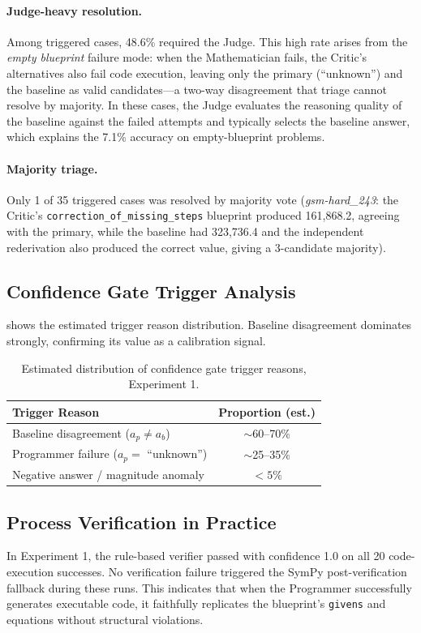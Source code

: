\documentclass[11pt,a4paper]{article}
\begin{document}
\paragraph{Judge-heavy resolution.}
Among triggered cases, 48.6\% required the Judge.
This high rate arises from the \emph{empty blueprint} failure mode: when the Mathematician fails, the Critic's alternatives also fail code execution, leaving only the primary (``unknown'') and the baseline as valid candidates---a two-way disagreement that triage cannot resolve by majority.
In these cases, the Judge evaluates the reasoning quality of the baseline against the failed attempts and typically selects the baseline answer, which explains the 7.1\% accuracy on empty-blueprint problems.
\paragraph{Majority triage.}
Only 1 of 35 triggered cases was resolved by majority vote (\textit{gsm-hard\_243}: the Critic's \texttt{correction\_of\_missing\_steps} blueprint produced 161,868.2, agreeing with the primary, while the baseline had 323,736.4 and the independent rederivation also produced the correct value, giving a 3-candidate majority).
\subsection{Confidence Gate Trigger Analysis}
 shows the estimated trigger reason distribution.
Baseline disagreement dominates strongly, confirming its value as a calibration signal.
\begin{table}[h]
\centering
\caption{Estimated distribution of confidence gate trigger reasons, Experiment 1.}
\label{tab:gate_reasons}
\begin{tabular}{lc}
\toprule
\textbf{Trigger Reason} & \textbf{Proportion (est.)} \\
\midrule
Baseline disagreement ($a_p \neq a_b$) & $\sim$60--70\% \\
Programmer failure ($a_p = $ ``unknown'') & $\sim$25--35\% \\
Negative answer / magnitude anomaly        & $<5\%$ \\
\bottomrule
\end{tabular}
\end{table}
\subsection{Process Verification in Practice}
In Experiment 1, the rule-based verifier passed with confidence 1.0 on all 20 code-execution successes.
No verification failure triggered the SymPy post-verification fallback during these runs.
This indicates that when the Programmer successfully generates executable code, it faithfully replicates the blueprint's \texttt{givens} and equations without structural violations.
\end{document}
